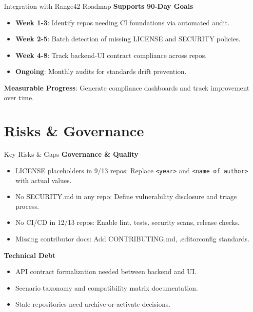 \documentclass[aspectratio=169]{beamer}
\begin{document}
\begin{frame}{Integration with Range42 Roadmap}
  \faRocket\;
  \textbf{Supports 90-Day Goals}
  \begin{itemize}
    \item \textbf{Week 1-3}: Identify repos needing CI foundations via automated audit.
    \item \textbf{Week 2-5}: Batch detection of missing LICENSE and SECURITY policies.
    \item \textbf{Week 4-8}: Track backend-UI contract compliance across repos.
    \item \textbf{Ongoing}: Monthly audits for standards drift prevention.
  \end{itemize}
  \begin{tcolorbox}
    \faLightbulb\; \textbf{Measurable Progress}: Generate compliance dashboards and track improvement over time.
  \end{tcolorbox}
\end{frame}

\section{Risks \& Governance}

\begin{frame}{Key Risks \& Gaps \; \faExclamationTriangle}
  \textbf{Governance \& Quality}
  \begin{itemize}
    \item \alert{LICENSE placeholders in 9/13 repos}: Replace \texttt{<year>} and \texttt{<name of author>} with actual values.
    \item \alert{No SECURITY.md in any repo}: Define vulnerability disclosure and triage process.
    \item \alert{No CI/CD in 12/13 repos}: Enable lint, tests, security scans, release checks.
    \item \alert{Missing contributor docs}: Add CONTRIBUTING.md, .editorconfig standards.
  \end{itemize}
  \vspace{2mm}
  \textbf{Technical Debt}
  \begin{itemize}
    \item API contract formalization needed between backend and UI.
    \item Scenario taxonomy and compatibility matrix documentation.
    \item Stale repositories need archive-or-activate decisions.
  \end{itemize}
\end{frame}
\end{document}

